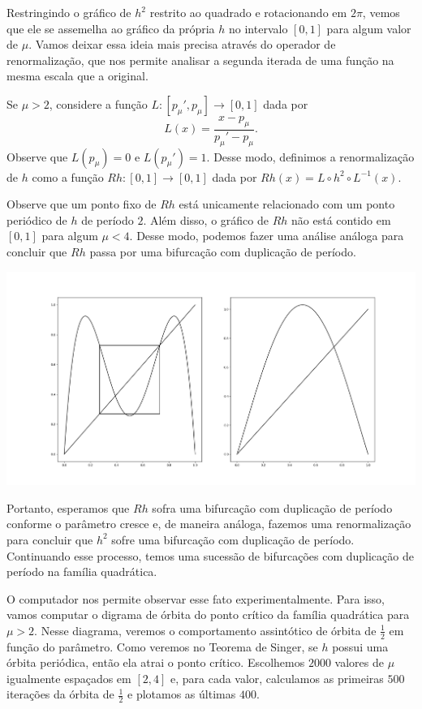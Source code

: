 Restringindo o gráfico de $h^2$ restrito ao quadrado e rotacionando em $2 \pi$, vemos que ele se assemelha ao gráfico da própria $h$ no intervalo $[0, 1]$ para algum valor de $\mu$. Vamos deixar essa ideia mais precisa através do operador de renormalização, que nos permite analisar a segunda iterada de uma função na mesma escala que a original.

Se $\mu > 2$, considere a função $L: [p_\mu', p_\mu] \to [0, 1]$ dada por
$$L(x) = \frac{x - p_\mu}{p_\mu' - p_\mu}.$$
Observe que $L(p_\mu) = 0$ e $L(p_\mu') = 1$. Desse modo, definimos a renormalização de $h$ como a função $Rh: [0, 1] \to [0, 1]$ dada por $Rh(x) = L \circ h^2 \circ L^{-1}(x)$.

Observe que um ponto fixo de $Rh$ está unicamente relacionado com um ponto periódico de $h$ de período $2$. Além disso, o gráfico de $Rh$ não está contido em $[0, 1]$ para algum $\mu < 4$. Desse modo, podemos fazer uma análise análoga para concluir que $Rh$ passa por uma bifurcação com duplicação de período. 

\begin{center}
\includegraphics[scale=0.3]{images/renormalization.png}
\end{center}

Portanto, esperamos que $Rh$ sofra uma bifurcação com duplicação de período conforme o parâmetro cresce e, de maneira análoga, fazemos uma renormalização para concluir que $h^2$ sofre uma bifurcação com duplicação de período. Continuando esse processo, temos uma sucessão de bifurcações com duplicação de período na família quadrática.

O computador nos permite observar esse fato experimentalmente. Para isso, vamos computar o digrama de órbita do ponto crítico da família quadrática para $\mu > 2$. Nesse diagrama, veremos o comportamento assintótico de órbita de $\frac{1}{2}$ em função do parâmetro. Como veremos no Teorema de Singer, se $h$ possui uma órbita periódica, então ela atrai o ponto crítico. Escolhemos $2000$ valores de $\mu$ igualmente espaçados em $[2, 4]$ e, para cada valor, calculamos as primeiras $500$ iterações da órbita de $\frac{1}{2}$ e plotamos as últimas $400$.

